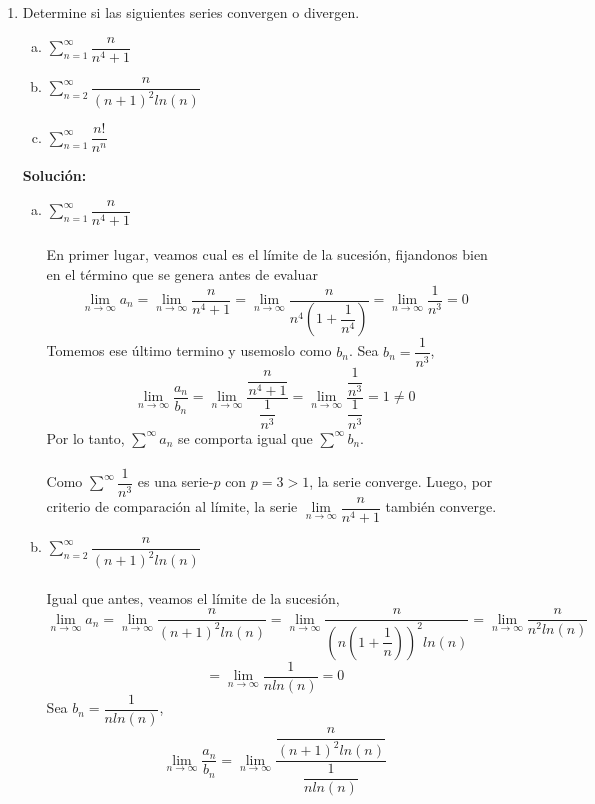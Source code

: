 \documentclass[12pt]{article}
\newenvironment{solucion}
{\begin{mdframed}[backgroundcolor=black!10]
		{\bf Solución:}\\
	}
	{
	\end{mdframed}
}
\newenvironment{preguntas}
{\begin{enumerate}\itemsep12pt
	}
	{
	\end{enumerate}
}
\newcommand{\ra}{\rightarrow}
\begin{document}
\begin{preguntas}
\item Determine si las siguientes series convergen o divergen.
\begin{enumerate}[a)]
\item $\sum\limits_{n=1}^{\infty}\dfrac{n}{n^4+1}$
\item $\sum\limits_{n=2}^{\infty}\dfrac{n}{(n+1)^2ln(n)}$
\item $\sum\limits_{n=1}^{\infty}\dfrac{n!}{n^n}$
\end{enumerate}
\begin{solucion}

\begin{enumerate}[a)]
\item $\sum\limits_{n=1}^{\infty}\dfrac{n}{n^4+1}$\\
			\\
			En primer lugar, veamos cual es el límite de la sucesión, fijandonos bien en el término que se genera antes de evaluar
			$$\lim\limits_{n \ra \infty} a_n
			= \lim\limits_{n \ra \infty} \dfrac{n}{n^4+1}
			= \lim\limits_{n \ra \infty} \dfrac{n}{n^4\left(1+\dfrac{1}{n^4}\right)}
			= \lim\limits_{n \ra \infty} \dfrac{1}{n^3} = 0$$
			Tomemos ese último termino y usemoslo como $b_n$. Sea $b_n = \dfrac{1}{n^3}$,
			$$\lim\limits_{n \ra \infty} \dfrac{a_n}{b_n}
			= \lim\limits_{n \ra \infty} \dfrac{\dfrac{n}{n^4+1}}{\dfrac{1}{n^3}}
			= \lim\limits_{n \ra \infty} \dfrac{\dfrac{1}{n^3}}{\dfrac{1}{n^3}} = 1 \neq 0$$
			Por lo tanto, $\sum\limits^{\infty} a_n$ se comporta igual que $\sum\limits^{\infty} b_n$.\\
			\\
			Como $\sum\limits^{\infty} \dfrac{1}{n^3}$ es una serie-$p$ con $p=3>1$, la serie converge. Luego, por criterio de comparación al límite, la serie $\lim\limits_{n \ra \infty} \dfrac{n}{n^4+1}$ también converge.
\item $\sum\limits_{n=2}^{\infty}\dfrac{n}{(n+1)^2ln(n)}$\\
			\\
			Igual que antes, veamos el límite de la sucesión,
			$$\lim\limits_{n \ra \infty} a_n
			= \lim\limits_{n \ra \infty} \dfrac{n}{(n+1)^2ln(n)}
			= \lim\limits_{n \ra \infty} \dfrac{n}{\left(n\left(1+\dfrac{1}{n}\right)\right)^2ln(n)}
			= \lim\limits_{n \ra \infty} \dfrac{n}{n^2ln(n)}$$
			$$= \lim\limits_{n \ra \infty} \dfrac{1}{nln(n)} = 0$$
			Sea $b_n = \dfrac{1}{nln(n)}$,
			$$\lim\limits_{n \ra \infty} \dfrac{a_n}{b_n}
			=\lim\limits_{n \ra \infty} \dfrac{\dfrac{n}{(n+1)^2ln(n)}}{\dfrac{1}{nln(n)}}
$$
\end{enumerate}
\end{solucion}
\end{preguntas}
\end{document}
